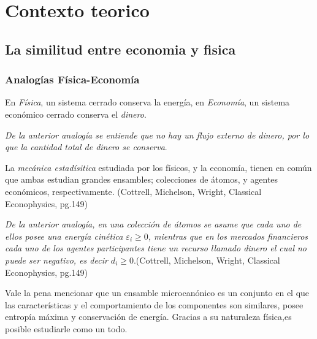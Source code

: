 %
\chapter{Contexto teorico}
\label{contexto}



\section{La similitud entre economia y fisica}

\subsection{Analogías Física-Economía} 

En \textit{Física}, un sistema cerrado conserva la energía,  en \textit{Economía}, un sistema económico cerrado conserva el \textit{dinero}. \newline

\textit{De la anterior analogía se entiende que no hay un flujo externo de dinero, por lo que la cantidad total de dinero se conserva}.

La \textit{mecánica estadísitica} estudiada por los físicos, y la economía, tienen en común que ambas estudian grandes ensambles; colecciones de átomos, y agentes económicos, respectivamente.
(Cottrell, Michelson, Wright, Classical Econophysics, pg.149)

\textit{De la anterior analogía, en una colección de átomos se asume que cada uno de ellos posee una energía cinética $\mathit{\varepsilon}_{i} \geqslant 0 $, mientras que en los mercados financieros cada uno de los agentes participantes tiene un recurso llamado dinero el cual no puede ser negativo, es decir  $\mathit{d}_{i} \geqslant 0 $}.(Cottrell, Michelson, Wright, Classical Econophysics, pg.149)

Vale la pena mencionar que un ensamble microcanónico es un conjunto  en el que las características y el comportamiento de los componentes son similares, posee entropía máxima y conservación de energía. Gracias a su naturaleza física,es posible estudiarle como un todo.  


